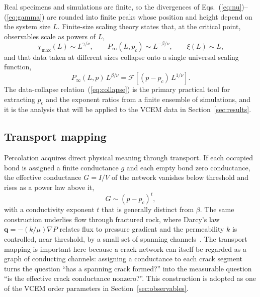 \documentclass[preprint,12pt]{elsarticle}
\begin{document}
Real specimens and simulations are finite, so the divergences of
Eqs.~(\ref{eq:nu})--(\ref{eq:gamma}) are rounded into finite peaks whose position and
height depend on the system size $L$. Finite-size scaling theory states that, at the
critical point, observables scale as powers of $L$,
\begin{equation}
\chi_{\max}(L) \sim L^{\gamma/\nu}, \qquad
P_\infty(L,p_c) \sim L^{-\beta/\nu}, \qquad
\xi(L) \sim L,
\label{eq:fss}
\end{equation}
and that data taken at different sizes collapse onto a single universal scaling
function,
\begin{equation}
P_\infty(L,p)\, L^{\beta/\nu} = \mathcal{F}\!\left[(p-p_c)\,L^{1/\nu}\right].
\label{eq:collapse}
\end{equation}
The data-collapse relation~(\ref{eq:collapse}) is the primary practical tool for
extracting $p_c$ and the exponent ratios from a finite ensemble of simulations, and
it is the analysis that will be applied to the VCEM data in
Section~\ref{sec:results}.

\subsection{Transport mapping}
\label{sec:transport}

Percolation acquires direct physical meaning through transport. If each occupied bond
is assigned a finite conductance $g$ and each empty bond zero conductance, the
effective conductance $G = I/V$ of the network vanishes below threshold and rises as
a power law above it,
\begin{equation}
G \sim (p-p_c)^{t},
\label{eq:conductivity}
\end{equation}
with a conductivity exponent $t$ that is generally distinct from $\beta$. The same
construction underlies flow through fractured rock, where Darcy's law
$\mathbf{q} = -(k/\mu)\nabla P$ relates flux to pressure gradient and the
permeability $k$ is controlled, near threshold, by a small set of spanning
channels~\cite{Sahimi1994}. The transport mapping is important here because a crack
network can itself be regarded as a graph of conducting channels: assigning a
conductance to each crack segment turns the question ``has a spanning crack formed?''
into the measurable question ``is the effective crack conductance nonzero?''. This
construction is adopted as one of the VCEM order parameters in
Section~\ref{sec:observables}.
\end{document}
